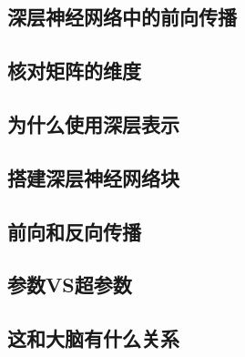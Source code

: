 \documentclass{article}
\begin{document}
\begin{CJK}{UTF8}{gbsn}
\subsection{深层神经网络中的前向传播}
\subsection{核对矩阵的维度}
\subsection{为什么使用深层表示}
\subsection{搭建深层神经网络块}
\subsection{前向和反向传播}
\subsection{参数VS超参数}
\subsection{这和大脑有什么关系}


\end{CJK}
\end{document}
